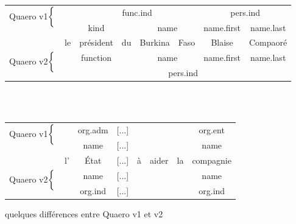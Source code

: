 \documentclass[12pt,a4paper,times,twoside,openright]{report}
\begin{document}
\begin{figure}
\centering
\begin{tabular}{cccccccc}
\multirow{2}{*}{Quaero v1$\left\{\vphantom{\begin{tabular}{c}.\\.\end{tabular}}\right.$} &    & \multicolumn{4}{c}{\cellcolor{red}func.ind}                                & \multicolumn{2}{c}{\cellcolor{yellow!75}pers.ind}\\
                           &    & \cellcolor{blue!50}kind     &     & \multicolumn{2}{c}{\cellcolor{green!75}name} & \cellcolor{red!33}name.first & \cellcolor{red!66}name.last\\
                           & le & président                   & du  & Burkina & Faso                               & Blaise     & Compaoré\\
\multirow{2}{*}{Quaero v2$\left\{\vphantom{\begin{tabular}{c}.\\.\end{tabular}}\right.$} &    & \cellcolor{teal!66}function &     & \multicolumn{2}{c}{\cellcolor{green!75}name} & \cellcolor{red!33}name.first & \cellcolor{red!66}name.last\\
                           &    & \multicolumn{6}{c}{\cellcolor{yellow!75}pers.ind}\\
\end{tabular}

~\\~\\

\begin{tabular}{cccccccc}
\multirow{2}{*}{Quaero v1$\left\{\vphantom{\begin{tabular}{c}.\\.\end{tabular}}\right.$} & & \cellcolor{blue!50}org.adm & [...] & & & & \cellcolor{teal!66}org.ent \\
 & & \cellcolor{red!66}name & [...] & & & & \cellcolor{red!66}name \\
 & l' & État & [...] & à & aider & la & compagnie \\
\multirow{2}{*}{Quaero v2$\left\{\vphantom{\begin{tabular}{c}.\\.\end{tabular}}\right.$}  & & \cellcolor{red!66}name & [...] & & & & \cellcolor{red!66}name \\
& & \cellcolor{green!66}org.ind & [...] & & & & \cellcolor{green!66}org.ind \\
\end{tabular}
\caption{quelques différences entre Quaero v1 et v2}
\label{fig:Quaerov1-vs-v2}
\end{figure}
\end{document}
